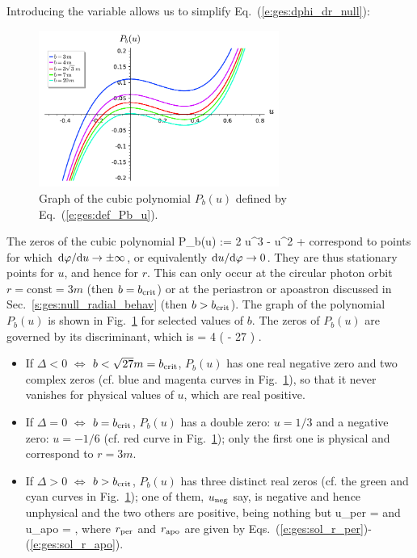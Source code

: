Introducing the variable
\be
\ee
allows us to simplify Eq.~(\ref{e:ges:dphi_dr_null}):
\be \label{e:ges:dphi_du_null}
\ee

\begin{figure}
\centerline{\includegraphics[width=0.7\textwidth]{ges_polynomial_b_u.pdf}}
\caption[]{\label{f:gis:polynomial_b_u} \footnotesize
Graph of the cubic polynomial $P_b(u)$ defined by Eq.~(\ref{e:ges:def_Pb_u}).}
\end{figure}

The zeros of the cubic polynomial
\be \label{e:ges:def_Pb_u}
        P_b(u) := 2 u^3 - u^2 + 
\ee
correspond to points for which $\mathrm{d}\varphi/\mathrm{d} u \to \pm \infty$,
or equivalently $\mathrm{d} u /\mathrm{d}\varphi \to 0$. They are thus stationary points
for $u$, and hence for $r$. This can only occur at the circular photon
orbit $r = \mathrm{const} = 3 m$ (then $b=b_{\rm crit}$)
or at the periastron or apoastron discussed
in Sec.~\ref{s:ges:null_radial_behav} (then $b > b_{\rm crit}$).
The graph of the polynomial $P_b(u)$ is shown in Fig.~\ref{f:gis:polynomial_b_u}
for selected values of $b$.
The zeros of $P_b(u)$ are governed by its
discriminant, which is
\be
    \Delta = 4  \left(  - 27 \right) .
\ee
\begin{itemize}
\item If $\Delta<0$ $\iff$ $b <\sqrt{27} m = b_{\rm crit}$,
$P_b(u)$ has one real negative zero and two complex zeros
(cf. blue and magenta curves in Fig.~\ref{f:gis:polynomial_b_u}),
so that it never vanishes
for physical values of $u$, which are real positive.
\item If $\Delta=0$ $\iff$ $b = b_{\rm crit}$, $P_b(u)$
has a double zero: $u=1/3$ and a negative zero: $u=-1/6$ (cf. red curve
in Fig.~\ref{f:gis:polynomial_b_u}); only the first
one is physical and correspond to $r=3m$.
\item If $\Delta>0$ $\iff$ $b > b_{\rm crit}$, $P_b(u)$ has three distinct
real zeros (cf. the green and cyan curves
in Fig.~\ref{f:gis:polynomial_b_u}); one of them, $u_{\rm neg}$ say, is
negative and hence unphysical and the two others are positive, being nothing but
\be \label{e:ges:def_u_per_apo}
    u_{\rm per} =  \qquad\mbox{and}\qquad
    u_{\rm apo} =  ,
\ee
where $r_{\rm per}$ and $r_{\rm apo}$ are given by
Eqs.~(\ref{e:ges:sol_r_per})-(\ref{e:ges:sol_r_apo}).
\end{itemize}

